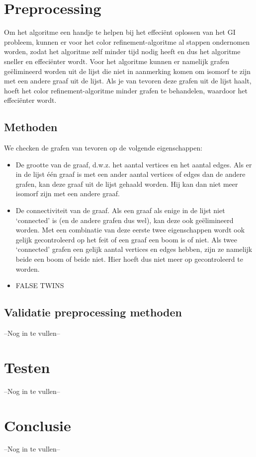 \documentclass{article}
\begin{document}

\section{Preprocessing}
Om het algoritme een handje te helpen bij het effeciënt oplossen van het GI probleem, kunnen er voor het color refinement-algoritme al stappen ondernomen worden, zodat het algoritme zelf minder tijd nodig heeft en dus het algoritme sneller en effeciënter wordt.
Voor het algoritme kunnen er namelijk grafen geëlimineerd worden uit de lijst die niet in aanmerking komen om isomorf te zijn met een andere graaf uit de lijst. Als je van tevoren deze grafen uit de lijst haalt, hoeft het color refinement-algoritme minder grafen te behandelen, waardoor het effeciënter wordt. 

\subsection{Methoden}
We checken de grafen van tevoren op de volgende eigenschappen:
\begin{itemize}
\item De grootte van de graaf, d.w.z. het aantal vertices en het aantal edges. Als er in de lijst één graaf is met een ander aantal vertices of edges dan de andere grafen, kan deze graaf uit de lijst gehaald worden. Hij kan dan niet meer isomorf zijn met een andere graaf.
\item De connectiviteit van de graaf. Als een graaf als enige in de lijst niet ‘connected’ is (en de andere grafen dus wel), kan deze ook geëlimineerd worden. Met een combinatie van deze eerste twee eigenschappen wordt ook gelijk gecontroleerd op het feit of een graaf een boom is of niet. Als twee ‘connected’ grafen een gelijk aantal vertices en edges hebben, zijn ze namelijk beide een boom of beide niet. Hier hoeft dus niet meer op gecontroleerd te worden.
\item FALSE TWINS
\end{itemize}

\subsection{Validatie preprocessing methoden}
--Nog in te vullen--


\section{Testen}
--Nog in te vullen--


\section{Conclusie}
--Nog in te vullen--
\end{document}
